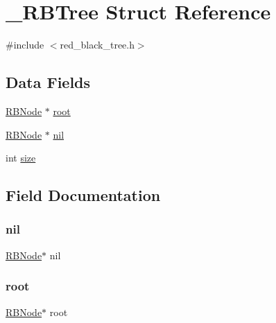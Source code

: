\hypertarget{struct___r_b_tree}{}\section{\+\_\+\+R\+B\+Tree Struct Reference}
\label{struct___r_b_tree}


{\ttfamily \#include $<$red\+\_\+black\+\_\+tree.\+h$>$}

\subsection*{Data Fields}
\begin{DoxyCompactItemize}
\item 
\hyperlink{red__black__tree_8h_ae5ed73a0cad3d682ef3f5441286e46dd}{R\+B\+Node} $\ast$ \hyperlink{struct___r_b_tree_a244d13afd8277697ba1bdb511cb701f0}{root}
\item 
\hyperlink{red__black__tree_8h_ae5ed73a0cad3d682ef3f5441286e46dd}{R\+B\+Node} $\ast$ \hyperlink{struct___r_b_tree_a3f2e5a35f51f0dfc9a7bfcb7d8803894}{nil}
\item 
int \hyperlink{struct___r_b_tree_a439227feff9d7f55384e8780cfc2eb82}{size}
\end{DoxyCompactItemize}


\subsection{Field Documentation}
\mbox{\label{struct___r_b_tree_a3f2e5a35f51f0dfc9a7bfcb7d8803894}} 
\subsubsection{\texorpdfstring{nil}{nil}}
{\footnotesize\ttfamily \hyperlink{red__black__tree_8h_ae5ed73a0cad3d682ef3f5441286e46dd}{R\+B\+Node}$\ast$ nil}

\mbox{\label{struct___r_b_tree_a244d13afd8277697ba1bdb511cb701f0}} 
\subsubsection{\texorpdfstring{root}{root}}
{\footnotesize\ttfamily \hyperlink{red__black__tree_8h_ae5ed73a0cad3d682ef3f5441286e46dd}{R\+B\+Node}$\ast$ root}

